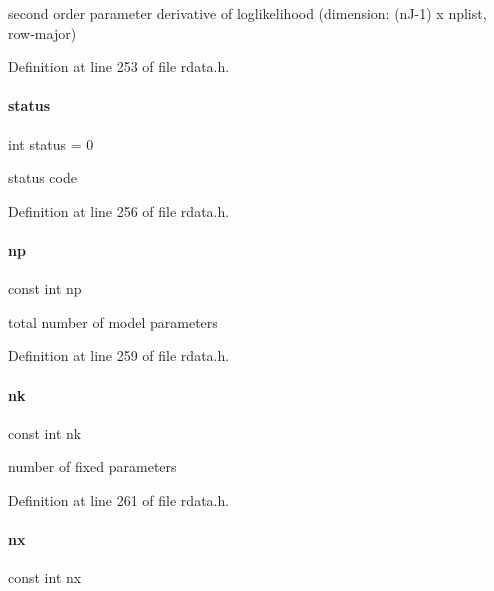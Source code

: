 second order parameter derivative of loglikelihood (dimension\+: (n\+J-\/1) x nplist, row-\/major) 

Definition at line 253 of file rdata.\+h.

\mbox{\label{classamici_1_1_return_data_a6e27f49150e9a14580fb313cc2777e00}} 
\paragraph{\texorpdfstring{status}{status}}
{\footnotesize\ttfamily int status = 0}

status code 

Definition at line 256 of file rdata.\+h.

\mbox{\label{classamici_1_1_return_data_a72e833f8ef129cac553feb1167223bc3}} 
\paragraph{\texorpdfstring{np}{np}}
{\footnotesize\ttfamily const int np}

total number of model parameters 

Definition at line 259 of file rdata.\+h.

\mbox{\label{classamici_1_1_return_data_a5e273eaccc1df0343f5a1d4d136f2f2c}} 
\paragraph{\texorpdfstring{nk}{nk}}
{\footnotesize\ttfamily const int nk}

number of fixed parameters 

Definition at line 261 of file rdata.\+h.

\mbox{\label{classamici_1_1_return_data_a4f88110916f09b2adef33396203ff015}} 
\paragraph{\texorpdfstring{nx}{nx}}
{\footnotesize\ttfamily const int nx}

